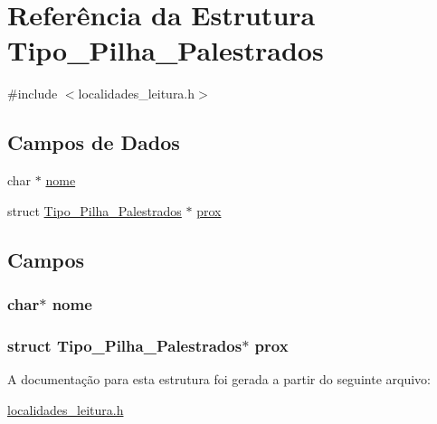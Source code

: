 \hypertarget{struct_tipo___pilha___palestrados}{}\section{Referência da Estrutura Tipo\+\_\+\+Pilha\+\_\+\+Palestrados}
\label{struct_tipo___pilha___palestrados}


{\ttfamily \#include $<$localidades\+\_\+leitura.\+h$>$}

\subsection*{Campos de Dados}
\begin{DoxyCompactItemize}
\item 
char $\ast$ \hyperlink{struct_tipo___pilha___palestrados_ae2a0f66178bb1c4d42e2b70ec9426ccb}{nome}
\item 
struct \hyperlink{struct_tipo___pilha___palestrados}{Tipo\+\_\+\+Pilha\+\_\+\+Palestrados} $\ast$ \hyperlink{struct_tipo___pilha___palestrados_aae1c1a9c8514e54024ccc9c35b9360ff}{prox}
\end{DoxyCompactItemize}


\subsection{Campos}
\hypertarget{struct_tipo___pilha___palestrados_ae2a0f66178bb1c4d42e2b70ec9426ccb}{}
\subsubsection[{nome}]{\setlength{\rightskip}{0pt plus 5cm}char$\ast$ nome}\label{struct_tipo___pilha___palestrados_ae2a0f66178bb1c4d42e2b70ec9426ccb}
\hypertarget{struct_tipo___pilha___palestrados_aae1c1a9c8514e54024ccc9c35b9360ff}{}
\subsubsection[{prox}]{\setlength{\rightskip}{0pt plus 5cm}struct {\bf Tipo\+\_\+\+Pilha\+\_\+\+Palestrados}$\ast$ prox}\label{struct_tipo___pilha___palestrados_aae1c1a9c8514e54024ccc9c35b9360ff}


A documentação para esta estrutura foi gerada a partir do seguinte arquivo\+:\begin{DoxyCompactItemize}
\item 
\hyperlink{localidades__leitura_8h}{localidades\+\_\+leitura.\+h}\end{DoxyCompactItemize}
